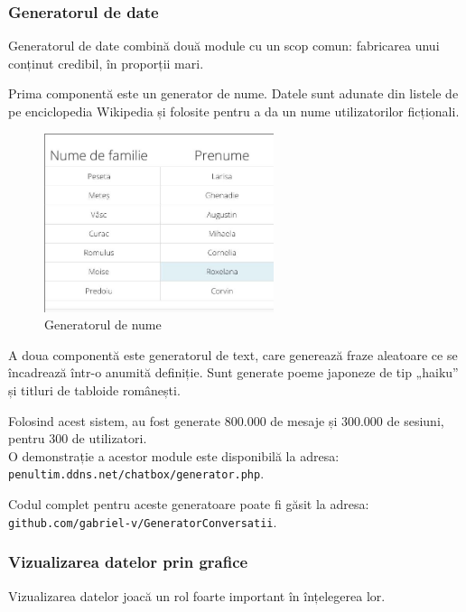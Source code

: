 \documentclass[12pt,a4paper]{article}
\begin{document}
\subsubsection{Generatorul de date}
Generatorul de date combină două module cu un scop comun: fabricarea unui conținut 
credibil, în proporții mari. 

Prima componentă este un generator de nume. Datele sunt adunate din listele de pe  
enciclopedia Wikipedia și folosite pentru a da un nume utilizatorilor ficționali.

\begin{figure}[!h]
	\centering
	\includegraphics[width=0.6\textwidth]{img/gen_nume.jpg}
	\caption{Generatorul de nume}
\end{figure} 

A doua componentă este generatorul de text, care generează fraze aleatoare ce 
se încadrează într-o anumită definiție. Sunt generate poeme japoneze de tip „haiku” și titluri de tabloide românești.

\vfill

Folosind acest sistem, au fost generate 800.000 de mesaje și 300.000 de sesiuni, pentru 300 de utilizatori. \\[0.7cm]

O demonstrație a acestor module este disponibilă la adresa: \\
\texttt{penultim.ddns.net/chatbox/generator.php}.

Codul complet pentru aceste generatoare poate fi găsit la adresa: \\
\texttt{github.com/gabriel-v/GeneratorConversatii}.

\newpage
\subsubsection{Vizualizarea datelor prin grafice}


Vizualizarea datelor joacă un rol foarte important în înțelegerea lor. \\[0.34cm]
\end{document}
